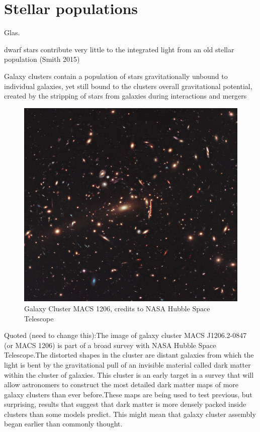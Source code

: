 \section{Stellar populations}
 
Glas.

dwarf stars contribute very little to the integrated light from an old stellar population (Smith 2015)

Galaxy clusters contain a population of stars gravitationally unbound to individual galaxies, yet still bound to the clusters overall gravitational potential, created by the stripping of stars from galaxies during interactions and mergers

\begin{figure}[H]
\centering
\includegraphics[width=12cm]{images/GC.jpg}
\caption[Galaxy Cluster MACS 1206]{Galaxy Cluster MACS 1206, credits to NASA Hubble Space Telescope}
\end{figure}

Quoted (need to change this):The image of galaxy cluster MACS J1206.2-0847 (or MACS 1206) is part of a broad survey with NASA Hubble Space Telescope.The distorted shapes in the cluster are distant galaxies from which the light is bent by the gravitational pull of an invisible material called dark matter within the cluster of galaxies. This cluster is an early target in a survey that will allow astronomers to construct the most detailed dark matter maps of more galaxy clusters than ever before.These maps are being used to test previous, but surprising, results that suggest that dark matter is more densely packed inside clusters than some models predict. This might mean that galaxy cluster assembly began earlier than commonly thought.

